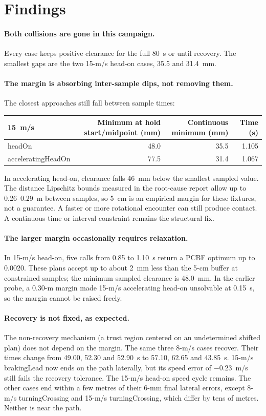 \documentclass[11pt]{article}
\begin{document}
\section{Findings}
\paragraph{Both collisions are gone in this campaign.} Every case keeps
positive clearance for the full 80~s or until recovery. The smallest gaps are
the two 15-m/s head-on cases, 35.5 and 31.4~mm.

\paragraph{The margin is absorbing inter-sample dips, not removing them.} The
closest approaches still fall between sample times:
\begin{center}\footnotesize
\begin{tabular}{lrrr}
\toprule
15~m/s & Minimum at hold start/midpoint (mm) & Continuous minimum (mm) & Time (s)\\
\midrule
headOn & 48.0 & 35.5 & 1.105\\
acceleratingHeadOn & 77.5 & 31.4 & 1.067\\
\bottomrule
\end{tabular}\end{center}
In accelerating head-on, clearance falls 46~mm below the smallest sampled
value. The distance Lipschitz bounds measured in the root-cause report allow
up to 0.26--0.29~m between samples, so 5~cm is an empirical margin for these
fixtures, not a guarantee. A faster or more rotational encounter can still
produce contact. A continuous-time or interval constraint remains the
structural fix.

\paragraph{The larger margin occasionally requires relaxation.} In 15-m/s
head-on, five calls from 0.85 to 1.10~s return a PCBF optimum up to 0.0020.
These plans accept up to about 2~mm less than the 5-cm buffer at constrained
samples; the minimum sampled clearance is 48.0~mm. In the earlier probe, a
0.30-m margin made 15-m/s accelerating head-on unsolvable at 0.15~s, so the
margin cannot be raised freely.

\paragraph{Recovery is not fixed, as expected.} The non-recovery mechanism (a
trust region centered on an undetermined shifted plan) does not depend on the
margin. The same three 8-m/s cases recover. Their times change from 49.00,
52.30 and 52.90~s to 57.10, 62.65 and 43.85~s. 15-m/s brakingLead now ends on
the path laterally, but its speed error of $-0.23$~m/s still fails the
recovery tolerance. The 15-m/s head-on speed cycle remains. The other cases end
within a few metres of their 6-mm final lateral errors, except 8-m/s
turningCrossing and 15-m/s turningCrossing, which differ by tens of metres.
Neither is near the path.
\end{document}
